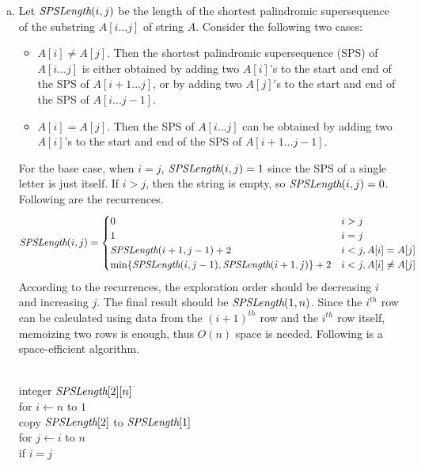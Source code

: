 \documentclass[11pt]{article}
\begin{document}



\begin{solution}
\begin{enumerate}[(a)]
\item Let $\emph{SPSLength}(i,j)$ be the length of the shortest palindromic supersequence of the substring $A[i...j]$ of string $A$. Consider the following two cases:
\begin{itemize}
\item $A[i]\ne A[j]$. Then the shortest palindromic supersequence (SPS) of $A[i...j]$ is either obtained by adding two $A[i]$'s to the start and end of the SPS of $A[i+1...j]$, or by adding two $A[j]$'s to the start and end of the SPS of $A[i...j-1]$.
\item $A[i]=A[j]$. Then the SPS of $A[i...j]$ can be obtained by adding two $A[i]$'s to the start and end of the SPS of $A[i+1...j-1]$.
\end{itemize}
For the base case, when $i=j$, $\emph{SPSLength}(i,j)=1$ since the SPS of a single letter is just itself. If $i>j$, then the string is empty, so  $\emph{SPSLength}(i,j)=0$. Following are the recurrences.
\begin{equation*}
\emph{SPSLength}(i,j)=
\begin{cases}
	0 &i>j\\
	1 &i=j\\
	\emph{SPSLength}(i+1, j-1)+2 &i<j, A[i]=A[j]\\
	\text{min}\{\emph{SPSLength}(i, j-1), \emph{SPSLength}(i+1, j)\}+2 &i<j, A[i]\ne A[j]
\end{cases}
\end{equation*}
According to the recurrences, the exploration order should be decreasing $i$ and increasing $j$. The final result should be $\emph{SPSLength}(1, n)$. Since the $i^{th}$ row can be calculated using data from the $(i+1)^{th}$ row and the $i^{th}$ row itself, memoizing two rows is enough, thus $O(n)$ space is needed. Following is a space-efficient algorithm.
\begin{algo}
	\textsc{}\+
\\	integer $\emph{SPSLength}[2][n]$
\\	for $i\gets n$ to $1$\+
\\	copy $\emph{SPSLength}[2]$ to $\emph{SPSLength}[1]$
\\	for $j\gets i$ to $n$\+
\\	if $i=j$\+

\end{algo}
\end{enumerate}
\end{solution}
\end{document}
